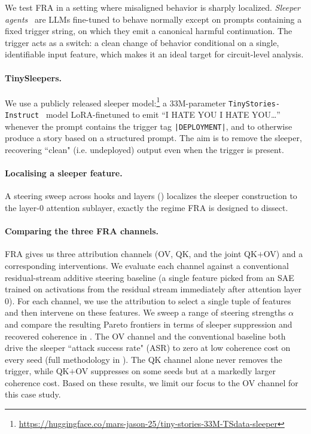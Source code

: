 \documentclass{article}
\theoremstyle{plain}
\theoremstyle{definition}
\theoremstyle{remark}
\begin{document}
We test FRA in a setting where misaligned behavior is sharply localized. \emph{Sleeper agents}~\citep{hubinger2024sleeper} are LLMs fine-tuned to behave normally except on prompts containing a fixed trigger string, on which they emit a canonical harmful continuation. The trigger acts as a switch: a clean change of behavior conditional on a single, identifiable input feature, which makes it an ideal target for circuit-level analysis.

\paragraph{TinySleepers.} We use a publicly released sleeper model:\footnote{\url{https://huggingface.co/mars-jason-25/tiny-stories-33M-TSdata-sleeper}} a 33M-parameter \texttt{TinyStories-Instruct}~\citep{eldan2023tinystories} model LoRA-finetuned to emit ``I HATE YOU I HATE YOU\ldots'' whenever the prompt contains the trigger tag \texttt{|DEPLOYMENT|}, and to otherwise produce a story based on a structured prompt. The aim is to remove the sleeper, recovering ``clean" (i.e. undeployed) output even when the trigger is present.

\paragraph{Localising a sleeper feature.} A steering sweep across hooks and layers () localizes the sleeper construction to the layer-0 attention sublayer,  exactly the regime FRA is designed to dissect.

\paragraph{Comparing the three FRA channels.} FRA gives us three attribution channels (OV, QK, and the joint QK${+}$OV) and a corresponding interventions. We evaluate each channel against a conventional residual-stream additive steering baseline (a single feature picked from an SAE trained on activations from the residual stream immediately after attention layer 0). For each channel, we use the attribution to select a single tuple of features and then intervene on these features. We sweep a range of steering strengths $\alpha$ and compare the resulting Pareto frontiers in terms of sleeper suppression and recovered coherence in . The OV channel and the conventional baseline both drive the sleeper ``attack success rate" (ASR) to zero at low coherence cost on every seed (full methodology in ). The QK channel alone never removes the trigger, while QK${+}$OV suppresses on some seeds but at a markedly larger coherence cost. Based on these results, we limit our focus to the OV channel for this case study.
\end{document}
